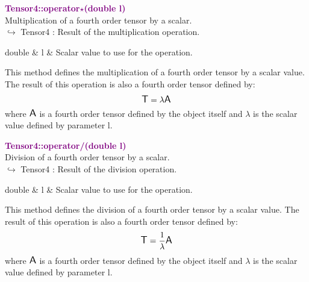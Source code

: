 \textcolor{purple}{\textbf{Tensor4::operator$\star$(double l)}}\label{Tensor4::operator*(double l)}\\
Multiplication of a fourth order tensor by a scalar.\\ \hspace*{10mm}$\hookrightarrow$ Tensor4 : Result of the multiplication operation.

\begin{tcolorbox}[width=\textwidth,myArgs,tabularx={ll|R}]
double & l & Scalar value to use for the operation.
\end{tcolorbox}

This method defines the multiplication of a fourth order tensor by a scalar value.
The result of this operation is also a fourth order tensor defined by:
\begin{equation*}
\mbox{\large\ensuremath{\mathsf{T}}} = \lambda \mbox{\large\ensuremath{\mathsf{A}}}
\end{equation*}
where $\mbox{\large\ensuremath{\mathsf{A}}}$ is a fourth order tensor defined by the object itself and $\lambda$ is the scalar value defined by parameter l.

\textcolor{purple}{\textbf{Tensor4::operator/(double l)}}\label{Tensor4::operator/(double l)}\\
Division of a fourth order tensor by a scalar.\\ \hspace*{10mm}$\hookrightarrow$ Tensor4 : Result of the division operation.

\begin{tcolorbox}[width=\textwidth,myArgs,tabularx={ll|R}]
double & l & Scalar value to use for the operation.
\end{tcolorbox}

This method defines the division of a fourth order tensor by a scalar value.
The result of this operation is also a fourth order tensor defined by:
\begin{equation*}
\mbox{\large\ensuremath{\mathsf{T}}} = \frac{1}{\lambda} \mbox{\large\ensuremath{\mathsf{A}}}
\end{equation*}
where $\mbox{\large\ensuremath{\mathsf{A}}}$ is a fourth order tensor defined by the object itself and $\lambda$ is the scalar value defined by parameter l.

